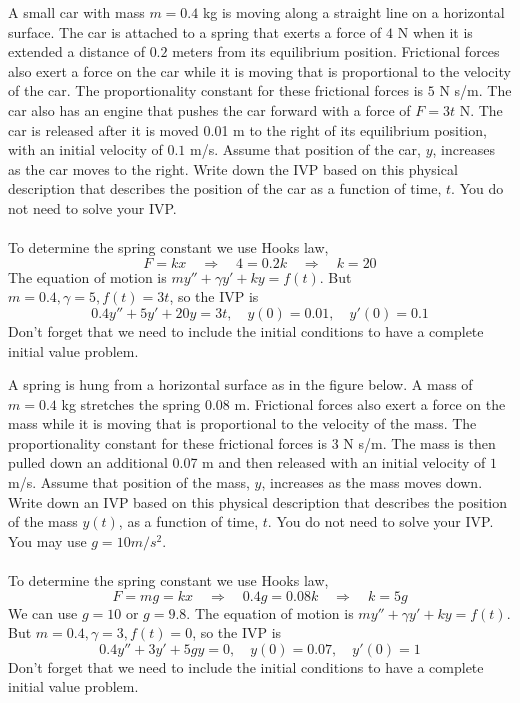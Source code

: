 \ifnum {}
\question[2] A small car with mass $m = 0.4$ kg is moving along a straight line on a horizontal surface. The car is attached to a spring that exerts a force of $4$ N when it is extended a distance of $0.2$ meters from its equilibrium position. Frictional forces also exert a force on the car while it is moving that is proportional to the velocity of the car. The proportionality constant for these frictional forces is $5$ N s/m. The car also has an engine that pushes the car forward with a force of $F = 3t$ N. The car is released after it is moved 0.01 m to the right of its equilibrium position, with an initial velocity of $0.1$ m/s. Assume that position of the car, $y$, increases as the car moves to the right. Write down the IVP based on this physical description that describes the position of the car as a function of time, $t$. You do not need to solve your IVP. \\

\ifnum {} {\color{DarkBlue} \\[12pt] 
To determine the spring constant we use Hooks law, 
$$F = kx \quad \Rightarrow \quad 4 = 0.2k \quad \Rightarrow \quad k = 20$$
The equation of motion is $my''+\gamma y' + ky = f(t)$.
But $m=0.4, \gamma = 5, f(t) = 3t$, so the IVP is
$$0.4y'' + 5 y' + 20y = 3t, \quad y(0) = 0.01, \quad y'(0) = 0.1$$
Don't forget that we need to include the initial conditions to have a complete initial value problem.
} 
\else 
\vfill
\fi
\fi 

\ifnum {}
\question[2] A spring is hung from a horizontal surface as in the figure below. A mass of $m=0.4$ kg stretches the spring 0.08 m. Frictional forces also exert a force on the mass while it is moving that is proportional to the velocity of the mass. The proportionality constant for these frictional forces is 3 N s/m. The mass is then pulled down an additional 0.07 m and then released with an initial velocity of $1$ m/s. Assume that position of the mass, $y$, increases as the mass moves down. Write down an IVP based on this physical description that describes the position of the mass $y(t)$, as a function of time, $t$. You do not need to solve your IVP. You may use $g=10 m/s^2$.  \\[4pt]

\ifnum {} {\color{DarkBlue} \\[12pt] 
To determine the spring constant we use Hooks law, 
$$F = mg  = kx \quad \Rightarrow \quad 0.4g = 0.08k \quad \Rightarrow \quad k = 5g$$
We can use $g=10$ or $g=9.8$. The equation of motion is $my''+\gamma y' + ky = f(t)$.
But $m=0.4, \gamma = 3, f(t) = 0$, so the IVP is
$$0.4y'' + 3 y' + 5gy = 0, \quad y(0) = 0.07, \quad y'(0) = 1$$
Don't forget that we need to include the initial conditions to have a complete initial value problem.
} 
\else 
\vfill
\fi
\fi 

